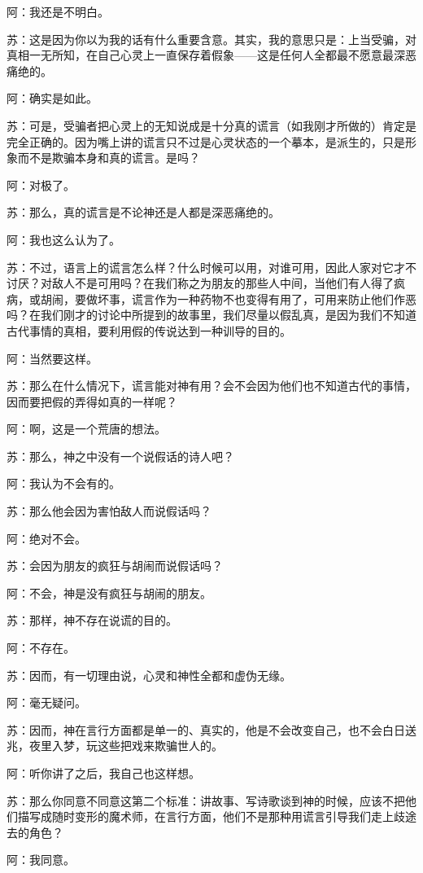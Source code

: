 \documentclass[11pt,oneside]{book}
\begin{document}
\begin{common-format}
阿：我还是不明白。

苏：这是因为你以为我的话有什么重要含意。其实，我的意思只是：上当受骗，对真相一无所知，在自己心灵上一直保存着假象——这是任何人全都最不愿意最深恶痛绝的。

阿：确实是如此。

苏：可是，受骗者把心灵上的无知说成是十分真的谎言（如我刚才所做的）肯定是完全正确的。因为嘴上讲的谎言只不过是心灵状态的一个摹本，是派生的，只是形象而不是欺骗本身和真的谎言。是吗？

阿：对极了。

苏：那么，真的谎言是不论神还是人都是深恶痛绝的。

阿：我也这么认为了。

苏：不过，语言上的谎言怎么样？什么时候可以用，对谁可用，因此人家对它才不讨厌？对敌人不是可用吗？在我们称之为朋友的那些人中间，当他们有人得了疯病，或胡闹，要做坏事，谎言作为一种药物不也变得有用了，可用来防止他们作恶吗？在我们刚才的讨论中所提到的故事里，我们尽量以假乱真，是因为我们不知道古代事情的真相，要利用假的传说达到一种训导的目的。

阿：当然要这样。

苏：那么在什么情况下，谎言能对神有用？会不会因为他们也不知道古代的事情，因而要把假的弄得如真的一样呢？

阿：啊，这是一个荒唐的想法。

苏：那么，神之中没有一个说假话的诗人吧？

阿：我认为不会有的。

苏：那么他会因为害怕敌人而说假话吗？

阿：绝对不会。

苏：会因为朋友的疯狂与胡闹而说假话吗？

阿：不会，神是没有疯狂与胡闹的朋友。

苏：那样，神不存在说谎的目的。

阿：不存在。

苏：因而，有一切理由说，心灵和神性全都和虚伪无缘。

阿：毫无疑问。

苏：因而，神在言行方面都是单一的、真实的，他是不会改变自己，也不会白日送兆，夜里入梦，玩这些把戏来欺骗世人的。

阿：听你讲了之后，我自己也这样想。

苏：那么你同意不同意这第二个标准：讲故事、写诗歌谈到神的时候，应该不把他们描写成随时变形的魔术师，在言行方面，他们不是那种用谎言引导我们走上歧途去的角色？

阿：我同意。


\end{common-format}
\end{document}
